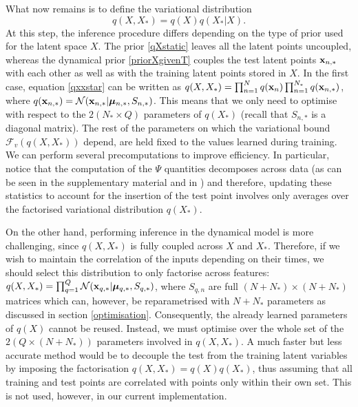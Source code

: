 \documentclass [10pt , a4paper]{article}
\begin{document}
\noindent What now remains is to define the variational distribution 
\begin{equation}
\label{qxxstar}
q(X,X_*) = q(X) q(X_*|X) .
\end{equation}
At this step, the inference procedure
differs depending on the type of prior used for the latent space $X$. The prior \eqref{qXstatic} leaves all the latent points
uncoupled, whereas the dynamical prior \eqref{priorXgivenT} couples the test latent points $\mathbf{x}_{n,*}$ with each other as well as with the
training latent points stored in $X$. In the first case, equation \eqref{qxxstar} can be written as 
$q(X,X_*) = \prod_{n=1}^N q(\mathbf{x}_n) \prod_{n=1}^{N_*} q(\mathbf{x}_{n,*})$, 
where $q(\mathbf{x}_{n,*}) = \mathcal{N}(\mathbf{x}_{n,*} | \boldsymbol \mu_{n,*}, S_{n,*})$. 
 This means that we only need to optimise with respect to the $2 (N_* \times Q)$ parameters of $q(X_*)$ 
 (recall that $S_{n,*}$ is a diagonal matrix). 
 The rest of the parameters
on which the variational bound $\mathcal{F}_v(q(X,X_*))$ depend, are held fixed to the values learned during training.
We can perform several precomputations to improve efficiency. In particular, notice that the computation
of the $\Psi$ quantities decomposes across data (as can be seen in the supplementary material and in \cite{BayesianGPLVM})
and therefore, 
updating
these statistics to account for the insertion of the test point
involves only averages over the factorised variational distribution $q(X_*)$.

\par On the other hand, performing inference in the dynamical model is more challenging, since $q(X,X_*)$ is fully
coupled across $X$ and $X_*$. Therefore, if we wish to maintain the correlation of the inputs depending on their times,
we should select this distribution to only factorise across features: 
$q(X,X_*) = \prod_{q=1}^Q  \mathcal{N} (\mathbf{x}_{q,*} | \boldsymbol \mu_{q,*} ,S_{q,*})$,
 where $S_{q,n}$ are full $(N+N_*) \times (N+N_*)$ matrices which can, however, be reparametrised with $N+N_*$
parameters as discussed in section \ref{optimisation}.
Consequently, the already learned parameters of $q(X)$ cannot be reused. Instead, we must optimise over the whole set of
the $2 \left( Q \times (N + N_*) \right)$ parameters involved in $q(X,X_*)$. A much faster but less
accurate method would be to decouple the test from the training latent variables by imposing the factorisation
$q(X,X_*) = q(X)q(X_*)$, thus assuming that all training and test points are correlated with points only within their own set.
This is not used, however, in our current implementation.
\end{document}
